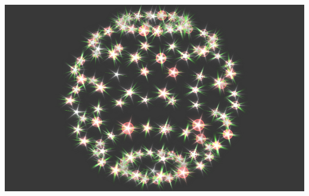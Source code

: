 \documentclass[a4paper,12pt,oneside]{sphinxmanual}
\begin{document}
{\hfill\includegraphics[width=1.000\linewidth]{halo.jpg}\hfill}
\end{document}
